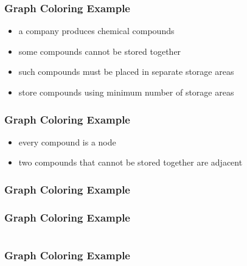 \documentclass[dvipsnames]{beamer}
\begin{document}
\begin{frame}
  \frametitle{Graph Coloring Example}

  \begin{itemize}
    \item a company produces chemical compounds
    \item some compounds cannot be stored together
    \item such compounds must be placed in separate storage areas

    \pause
    \medskip
    \item store compounds using minimum number of storage areas
  \end{itemize}
\end{frame}

\begin{frame}
  \frametitle{Graph Coloring Example}

  \begin{itemize}
    \item every compound is a node
    \item two compounds that cannot be stored together are adjacent
  \end{itemize}

  \begin{center}
  \end{center}
\end{frame}

\begin{frame}
  \frametitle{Graph Coloring Example}

  \begin{center}
  \end{center}
\end{frame}

\begin{frame}
  \frametitle{Graph Coloring Example}

  \begin{columns}
    \begin{center}
    \end{center}

    \begin{center}
    \end{center}
  \end{columns}
\end{frame}

\begin{frame}
  \frametitle{Graph Coloring Example}

  \begin{columns}
    \begin{center}
    \end{center}

    \begin{center}
    \end{center}
  \end{columns}
\end{frame}
\end{document}
